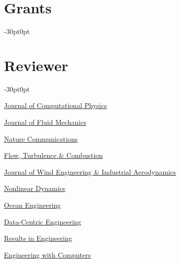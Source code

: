 \documentclass[line]{res}
\newenvironment{p1}
{\begin{adjustwidth}{-30pt}{0pt}
\vspace{8pt}}
{\end{adjustwidth}}
\begin{document}
\begin{resume}
\section{Grants}
\begin{p1}
\begin{etaremune}
    \item {}
    \item {}
    \item {}
    \item {}
    \item {}
\end{etaremune}
\end{p1}

\section{Reviewer}
\begin{p1}
\begin{etaremune}
    \item \href{https://www.sciencedirect.com/journal/journal-of-computational-physics}{Journal of Computational Physics}
    \item \href{https://www.cambridge.org/core/journals/journal-of-fluid-mechanics}{Journal of Fluid Mechanics}
    \item \href{https://www.nature.com/ncomms/}{Nature Communications}
    \item \href{https://link.springer.com/journal/10494}{Flow, Turbulence \& Combustion}
    \item \href{https://www.sciencedirect.com/journal/journal-of-wind-engineering-and-industrial-aerodynamics}{Journal of Wind Engineering \& Industrial Aerodynamics}
    \item \href{https://link.springer.com/journal/11071}{Nonlinear Dynamics}
    \item \href{https://www.sciencedirect.com/journal/ocean-engineering}{Ocean Engineering}
    \item \href{https://www.cambridge.org/core/journals/data-centric-engineering}{Data-Centric Engineering}
    \item \href{https://www.sciencedirect.com/journal/results-in-engineering}{Results in Engineering}
    \item \href{https://link.springer.com/journal/366}{Engineering with Computers}
\end{etaremune}
\end{p1}


\end{resume}
\end{document}
